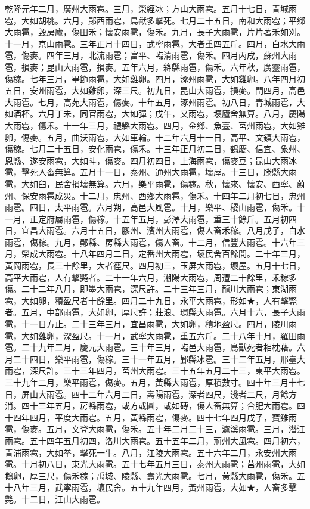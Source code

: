 \begin{pinyinscope}
乾隆元年二月，廣州大雨雹。三月，榮經冰；方山大雨雹。五月十七日，青城雨雹，大如胡桃。六月，鄖西雨雹，鳥獸多擊死。七月二十五日，南和大雨雹；平鄉大雨雹，毀房廬，傷田禾；懷安雨雹，傷禾。九月，長子大雨雹，片片著禾如刈。十一月，京山雨雹。三年正月十四日，武寧雨雹，大者重四五斤。四月，白水大雨雹，傷麥。四年三月，北流雨雹；富平、臨清雨雹，傷禾。四月丙戌，蘇州大雨雹，損麥；昆山大雨雹，損麥。五年六月，絳縣雨雹，傷禾。六年秋，廣靈雨雹，傷稼。七年三月，畢節雨雹，大如雞卵。四月，涿州雨雹，大如雞卵。八年四月初五日，安州雨雹，大如雞卵，深三尺。初九日，昆山大雨雹，損麥。閏四月，高邑大雨雹。七月，高苑大雨雹，傷麥。十年五月，涿州雨雹。初八日，青城雨雹，大如酒杯。六月丁未，同官雨雹，大如彈；戊午，又雨雹，壞廬舍無算。八月，慶陽大雨雹，傷禾。十一年三月，禮縣大雨雹。四月，金鄉、魚臺、莒州雨雹，大如雞卵，傷麥。五月，曲沃雨雹，大如車輪。十二年六月十一日，高平、文鎮大雨雹，傷稼。七月二十五日，安化雨雹，傷禾。十三年正月初二日，鶴慶、信宜、象州、恩縣、遂安雨雹，大如斗，傷麥。四月初四日，上海雨雹，傷麥豆；昆山大雨冰雹，擊死人畜無算。五月十一日，泰州、通州大雨雹，壞屋。十三日，滕縣大雨雹，大如臼，民舍損壞無算。六月，樂平雨雹，傷稼。秋，懷來、懷安、西寧、蔚州、保安雨雹成災。十二月，忠州、西鄉大雨雹，傷禾。十四年二月初七日，忠州雨雹。四日，太平雨雹。六月朔，高邑大風雹。十月，樂平、稷山雨雹，傷禾。十一月，正定府屬雨雹，傷稼。十五年五月，彭澤大雨雹，重三十餘斤。五月初四日，宜昌大雨雹。六月十五日，膠州、濱州大雨雹，傷人畜禾稼。八月戊子，白水雨雹，傷稼。九月，鄖縣、房縣大雨雹，傷人畜。十二月，信豐大雨雹。十六年三月，榮成大雨雹。十八年四月二日，定番州大雨雹，壞民舍百餘間。二十年三月，黃岡雨雹，長三十餘里，大者徑尺。四月初三，玉屏大雨雹，壞屋。五月十七日，高平大雨雹，人有擊斃者。二十一年六月，潮陽大雨雹，周遭二十餘里，禾稼多傷。二十二年八月，即墨大雨雹，深尺許。二十三年三月，龍川大雨雹；東湖雨雹，大如卵，積盈尺者十餘里。四月二十九日，永平大雨雹，形如★，人有擊斃者。五月，中部雨雹，大如卵，厚尺許；莊浪、環縣大雨雹。六月十六，長子大雨雹，十一日方止。二十三年三月，宜昌雨雹，大如卵，積地盈尺。四月，陵川雨雹，大如雞卵，深盈尺。十一月，武寧大雨雹，重五六斤。二十八年十月，羅田雨雹。二十九年二月，慶元大雨雹。三十年三月，臨邑大雨雹，鳥獸死者相枕藉。六月二十四日，樂平雨雹，傷稼。三十一年五月，鄞縣冰雹。三十二年五月，邢臺大雨雹，深尺許。三十三年四月，莒州大雨雹。三十五年五月二十三，東平大雨雹。三十九年二月，樂平雨雹，傷麥。五月，黃縣大雨雹，厚積數寸。四十年三月十七日，屏山大雨雹。四十二年六月二日，壽陽雨雹，深者四尺，淺者二尺，月餘方消。四十三年五月，房縣雨雹，或方或圓，或如磚，傷人畜無算；合肥大雨雹。四十四年四月，平度大雨雹。五月，黃縣雨雹，傷麥。四十七年四月戊子，寶雞雨雹，傷麥。五月，文登大雨雹，傷禾。五十年二月二十三，瀘溪雨雹。三月，潛江雨雹。五十四年五月初四，洛川大雨雹。五十五年二月，荊州大風雹。四月初六，青浦雨雹，大如拳，擊死一牛。八月，江陵大雨雹。五十六年二月，永安州大雨雹。十月初八日，東光大雨雹。五十七年五月三日，泰州大雨雹；莒州雨雹，大如鵝卵，厚三尺，傷禾稼；禹城、陵縣、壽光大雨雹。七月，黃縣大雨雹，傷禾。五十八年三月，武寧雨雹，壞民舍。五十九年四月，黃州雨雹，大如★，人畜多擊斃。十二日，江山大雨雹。


\end{pinyinscope}

